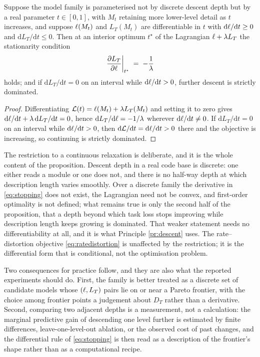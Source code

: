 \begin{proposition}\label{prop:stopping}
Suppose the model family is parameterised not by discrete descent depth but by a real parameter
$t \in [0,1]$, with $M_t$ retaining more lower-level detail as $t$ increases, and suppose
$\ell(M_t)$ and $L_T(M_t)$ are differentiable in $t$ with
$\mathrm{d}\ell/\mathrm{d}t \ge 0$ and $\mathrm{d}L_T/\mathrm{d}t \le 0$. Then at an interior optimum
$t^{\star}$ of the Lagrangian $\ell + \lambda L_T$ the stationarity condition
\begin{equation}\label{eq:stopping}
\left.\frac{\partial L_T}{\partial \ell}\right|_{t^{\star}} \;=\; -\frac{1}{\lambda}
\end{equation}
holds; and if $\mathrm{d}L_T/\mathrm{d}t = 0$ on an interval while $\mathrm{d}\ell/\mathrm{d}t > 0$,
further descent is strictly dominated.
\end{proposition}

\begin{proof}
Differentiating $\mathcal{L}(t) = \ell(M_t) + \lambda L_T(M_t)$ and setting it to zero gives
$\mathrm{d}\ell/\mathrm{d}t + \lambda\,\mathrm{d}L_T/\mathrm{d}t = 0$, hence
$\mathrm{d}L_T/\mathrm{d}\ell = -1/\lambda$ wherever $\mathrm{d}\ell/\mathrm{d}t \ne 0$. If
$\mathrm{d}L_T/\mathrm{d}t = 0$ on an interval while $\mathrm{d}\ell/\mathrm{d}t > 0$, then
$\mathrm{d}\mathcal{L}/\mathrm{d}t = \mathrm{d}\ell/\mathrm{d}t > 0$ there and the objective is
increasing, so continuing is strictly dominated.
\end{proof}

The restriction to a continuous relaxation is deliberate, and it is the whole content of the
proposition. Descent depth in a real code base is discrete: one either reads a module or one does
not, and there is no half-way depth at which description length varies smoothly. Over a discrete
family the derivative in \eqref{eq:stopping} does not exist, the Lagrangian need not be convex, and
first-order optimality is not defined; what remains true is only the second half of the proposition,
that a depth beyond which task loss stops improving while description length keeps growing is
dominated. That weaker statement needs no differentiability at all, and it is what
Principle \ref{pr:descent} uses. The rate--distortion objective \eqref{eq:ratedistortion} is
unaffected by the restriction; it is the differential form that is conditional, not the optimisation
problem.

Two consequences for practice follow, and they are also what the reported experiments should do.
First, the family is better treated as a discrete set of candidate models whose $(\ell, L_T)$ pairs
lie on or near a Pareto frontier, with the choice among frontier points a judgement about $D_T$ rather
than a derivative. Second, comparing two adjacent depths is a measurement, not a calculation: the
marginal predictive gain of descending one level further is estimated by finite differences,
leave-one-level-out ablation, or the observed cost of past changes, and the differential rule of
\eqref{eq:stopping} is then read as a description of the frontier's shape rather than as a
computational recipe.

